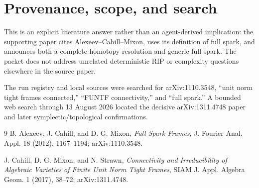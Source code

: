 \documentclass[11pt]{article}
\begin{document}
\section*{Provenance, scope, and search}

This is an explicit literature answer rather than an agent-derived
implication: the supporting paper cites Alexeev--Cahill--Mixon, uses its
definition of full spark, and announces both a complete homotopy resolution
and generic full spark.  The packet does not address unrelated deterministic
RIP or complexity questions elsewhere in the source paper.

The run registry and local sources were searched for arXiv:1110.3548,
``unit norm tight frames connected,'' ``FUNTF connectivity,'' and
``full spark.''  A bounded web search through 13 August 2026 located the
decisive arXiv:1311.4748 paper and later symplectic/topological confirmations.

\begin{thebibliography}{9}
B. Alexeev, J. Cahill, and D. G. Mixon,
\emph{Full Spark Frames},
J. Fourier Anal. Appl. 18 (2012), 1167--1194;
arXiv:1110.3548.

J. Cahill, D. G. Mixon, and N. Strawn,
\emph{Connectivity and Irreducibility of Algebraic Varieties of Finite Unit
Norm Tight Frames},
SIAM J. Appl. Algebra Geom. 1 (2017), 38--72;
arXiv:1311.4748.
\end{thebibliography}
\end{document}
